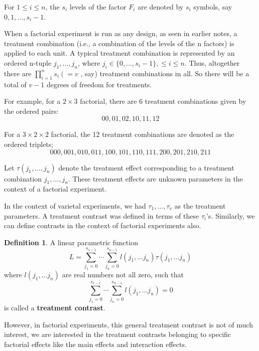\documentclass[12pt]{article}
\theoremstyle{definition}
\newtheorem{defn}{Definition}
\newenvironment{definition}{
\begin{tcolorbox}[colback=green!5!white,colframe=green!75!black, parbox = false]\begin{defn} }{\end{defn}\end{tcolorbox} }
\begin{document}
For $1 \leq i \leq n$, the $s_i$ levels of the  factor $F_i$ are denoted by $s_i$ symbols, say  $0, 1, \ldots, s_i-1$.

When a factorial experiment is run as any design, as seen in earlier notes, a treatment combination (i.e., a combination of the levels of the n factors) is applied to each unit.  A typical treatment combination is represented by an ordered n-tuple $ j_1 , \ldots, j_n$, where  $j_i \in \{0, \ldots, s_i-1\}, \leq i \leq n$.  Thus, altogether there are $\prod_{i=1}^n s_i\left(=v\right.$ , say) treatment combinations in all. So there will be a total of $v-1$ degrees of freedom for treatments.

For example, for a $2\times 3$ factorial, there are 6 treatment combinations given by the ordered pairs: $$00, 01, 02, 10, 11, 12$$ 

For a $3\times 2\times 2$ factorial, the 12 treatment combinations are denoted as the ordered triplets; $$000, 001, 010, 011,  100, 101, 110, 111, 200, 201, 210, 211$$ 

Let  $\tau (j_1, \ldots,  j_n)$  denote  the  treatment  effect  corresponding  to  a  treatment combination $j_1, \ldots, j_n$. These treatment effects are unknown parameters in the context of a factorial experiment.  

In the context of varietal experiments, we had $\tau_1, \ldots, \tau_v$ as the treatment parameters. A treatment contrast was defined in terms of these $\tau_i$'s. Similarly, we can define contrasts in the context of factorial experiments also.

\begin{definition}
    A linear parametric function
    \begin{equation}
        L = \sum_{j_1=0}^{s_{1-1}} \cdots \sum_{j_n=0}^{s{_{n-1}}} l(j_1, \ldots j_n) \tau(j_1, \ldots j_n)
    \end{equation}
    where $l(j_1, \ldots j_n)$ are real numbers not all zero, such that 
    \begin{equation}
        \sum_{j_1=0}^{s_{1-1}} \cdots \sum_{j_n=0}^{s{_{n-1}}}  l(j_1, \ldots j_n) =0
    \end{equation}
    is called a \textbf{treatment contrast}. 
\end{definition}

However, in factorial experiments, this general treatment contrast is not of much interest, we are interested in the treatment contrasts belonging to specific factorial effects like the main effects and interaction effects.  
\end{document}
